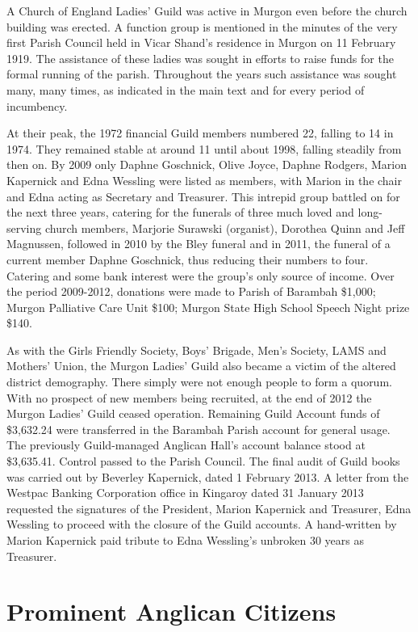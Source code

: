 A Church of England Ladies' Guild was active in Murgon even before the church building was erected. A function group is mentioned in the minutes of the very first Parish Council held in Vicar Shand's residence in Murgon on 11 February 1919. The assistance of these ladies was sought in efforts to raise funds for the formal running of the parish. Throughout the years such assistance was sought many, many times, as indicated in the main text and for every period of incumbency.

At their peak, the 1972 financial Guild members numbered 22, falling to 14 in 1974. They remained stable at around 11 until about 1998, falling steadily from then on. By 2009 only Daphne Goschnick, Olive Joyce, Daphne Rodgers, Marion Kapernick and Edna Wessling were listed as members, with Marion in the chair and Edna acting as Secretary and Treasurer. This intrepid group battled on for the next three years, catering for the funerals of three much loved and long-serving church members, Marjorie Surawski (organist), Dorothea Quinn and Jeff Magnussen, followed in 2010 by the Bley funeral and in 2011, the funeral of a current member Daphne Goschnick, thus reducing their numbers to four. Catering and some bank interest were the group's only source of income. Over the period 2009-2012, donations were made to Parish of Barambah \$1,000; Murgon Palliative Care Unit \$100; Murgon State High School Speech Night prize \$140.

As with the Girls Friendly Society, Boys' Brigade, Men's Society, LAMS and Mothers' Union, the Murgon Ladies' Guild also became a victim of the altered district demography. There simply were not enough people to form a quorum. With no prospect of new members being recruited, at the end of 2012 the Murgon Ladies' Guild ceased operation. Remaining Guild Account funds of \$3,632.24 were transferred in the Barambah Parish account for general usage. The previously Guild-managed Anglican Hall's account balance stood at \$3,635.41. Control passed to the Parish Council. The final audit of Guild books was carried out by Beverley Kapernick, dated 1 February 2013. A letter from the Westpac Banking Corporation office in Kingaroy dated 31 January 2013 requested the signatures of the President, Marion Kapernick and Treasurer, Edna Wessling to proceed with the closure of the Guild accounts. A hand-written by Marion Kapernick paid tribute to Edna Wessling's unbroken 30 years as Treasurer.

\hypertarget{prominent-anglican-citizens}{%
\chapter{Prominent Anglican Citizens}\label{prominent-anglican-citizens}}


